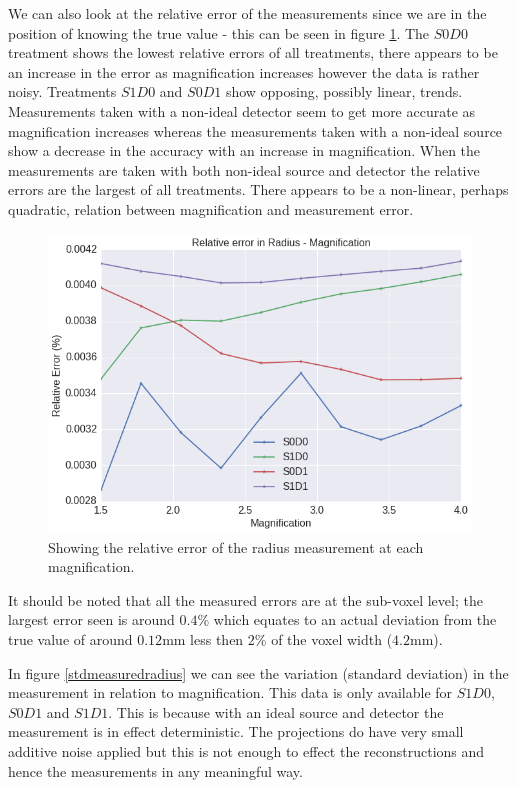 \documentclass[
  twoside,
  11pt, a4paper,
  footinclude=true,
  headinclude=true,
  cleardoublepage=empty
]{scrbook}
\begin{document}
We can also look at the relative error of the measurements since we are in the position of knowing the true value - this can be seen in figure \ref{relerrormeasuredradius}. The $S0D0$ treatment shows the lowest relative errors of all treatments, there appears to be an increase in the error as magnification increases however the data is rather noisy. Treatments $S1D0$ and $S0D1$ show opposing, possibly linear, trends. Measurements taken with a non-ideal detector seem to get more accurate as magnification increases whereas the measurements taken with a non-ideal source show a decrease in the accuracy with an increase in magnification. When the measurements are taken with both non-ideal source and detector the relative errors are the largest of all treatments. There appears to be a non-linear, perhaps quadratic, relation between magnification and measurement error.

\begin{figure}[h!]
  \centering
    \includegraphics[width=\textwidth]{figures/output_8_0.png}
    \caption{Showing the relative error of the radius measurement at each magnification.}
        \label{relerrormeasuredradius}
\end{figure}

It should be noted that all the measured errors are at the sub-voxel level; the largest error seen is around $0.4\%$ which equates to an actual deviation from the true value of around $0.12$mm less then $2\%$ of the voxel width ($4.2$mm).

In figure \ref{stdmeasuredradius} we can see the variation (standard deviation) in the measurement in relation to magnification. This data is only available for $S1D0$, $S0D1$ and $S1D1$. This is because with an ideal source and detector the measurement is in effect deterministic. The projections do have very small additive noise applied but this is not enough to effect the reconstructions and hence the measurements in any meaningful way.
\end{document}
